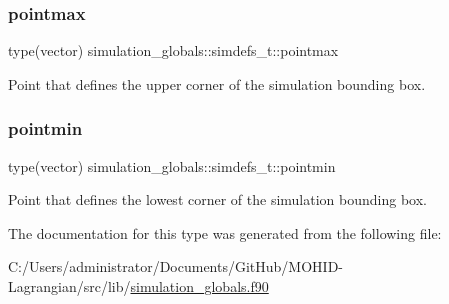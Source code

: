 \mbox{\label{structsimulation__globals_1_1simdefs__t_a8c7a365078a69252312ea200c619bcb6}} 
\subsubsection{\texorpdfstring{pointmax}{pointmax}}
{\footnotesize\ttfamily type(vector) simulation\+\_\+globals\+::simdefs\+\_\+t\+::pointmax\hspace{0.3cm}{\ttfamily [private]}}



Point that defines the upper corner of the simulation bounding box. 

\mbox{\label{structsimulation__globals_1_1simdefs__t_a76b66c4e9d305de6a0c3b8f1bd2ef319}} 
\subsubsection{\texorpdfstring{pointmin}{pointmin}}
{\footnotesize\ttfamily type(vector) simulation\+\_\+globals\+::simdefs\+\_\+t\+::pointmin\hspace{0.3cm}{\ttfamily [private]}}



Point that defines the lowest corner of the simulation bounding box. 



The documentation for this type was generated from the following file\+:\begin{DoxyCompactItemize}
\item 
C\+:/\+Users/administrator/\+Documents/\+Git\+Hub/\+M\+O\+H\+I\+D-\/\+Lagrangian/src/lib/\hyperlink{simulation__globals_8f90}{simulation\+\_\+globals.\+f90}\end{DoxyCompactItemize}
